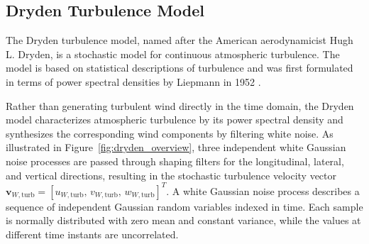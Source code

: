 \subsection{Dryden Turbulence Model}
\label{sec:2.3.1Dryden}

The Dryden turbulence model, named after the American aerodynamicist Hugh L. Dryden, is a stochastic model for continuous atmospheric turbulence. The model is based on statistical descriptions of turbulence and was first formulated in terms of power spectral densities by Liepmann in 1952 \cite{Liepmann1952Dryden}. 

Rather than generating turbulent wind directly in the time domain, the Dryden model characterizes atmospheric turbulence by its power spectral density and synthesizes the corresponding wind components by filtering white noise. As illustrated in Figure~\ref{fig:dryden_overview}, three independent white Gaussian noise processes are passed through shaping filters for the longitudinal, lateral, and vertical directions, resulting in the stochastic turbulence velocity vector 
$\bm{v}_{W, \mathrm{turb}} =
[u_{W, \mathrm{turb}}, \, v_{W, \mathrm{turb}}, \, w_{W, \mathrm{turb}}]^T$.
A white Gaussian noise process describes a sequence of independent Gaussian random variables indexed in time. Each sample is normally distributed with zero mean and constant variance, while the values at different time instants are uncorrelated.

